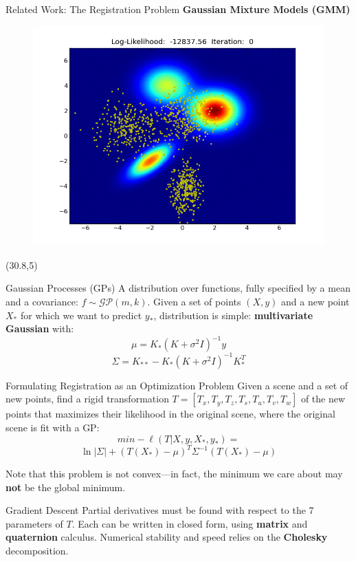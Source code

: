 \documentclass[final]{beamer}
\begin{document}
\begin{frame}{}
\begin{textblock}{27}
\begin{block}{Related Work: The Registration Problem}
{\bf Gaussian Mixture Models (GMM)}
\begin{figure}
\includegraphics[width=10in]{register2D.png}
\end{figure}

\end{block}
\end{textblock}

\begin{textblock}{27.5}(30.8,5)
\begin{block}{Gaussian Processes (GPs)}
A distribution over functions, fully specified by a mean and a covariance:
$f \sim \mathcal{GP}(m,k)$. Given a set of points $(X,y)$ and a new point $X_*$ for which we want to predict $y_*$, 
distribution is simple: {\bf multivariate Gaussian} with:
$$\mu = K_* (K + \sigma^2 I)^{-1}y$$
$$\Sigma = K_{**} - K_* (K + \sigma^2 I)^{-1} K_*^T$$
\end{block}

\begin{block}{Formulating Registration as an Optimization Problem}
Given a scene and a set of new points, find a rigid transformation $T = [T_x,T_y,T_z,T_s,T_u,T_v,T_w]$ of the new points 
that maximizes their likelihood in the original scene, where the original scene is fit with a GP:
$$min -\ell(T|X,y,X_*,y_*) =$$
$$ \ln|\Sigma| + (T(X_*) - \mu)^T \Sigma^{-1} (T(X_*) - \mu)$$

Note that this problem is not convex---in fact, the minimum we care about may {\bf not} be the global minimum. 
\end{block}
\begin{block}{Gradient Descent}
Partial derivatives must be found with respect to the 7 parameters of $T$. Each can be written in closed form,
using {\bf matrix} and {\bf quaternion} calculus. Numerical stability and speed relies on the {\bf Cholesky} decomposition.
\end{block}


\end{textblock}
\end{frame}
\end{document}
